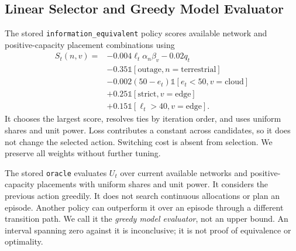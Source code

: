 \documentclass[letterpaper,journal]{IEEEtran}
\newcommand{\pol}[1]{\texttt{#1}}
\begin{document}
\subsection{Linear Selector and Greedy Model Evaluator}
The stored \pol{information\_equivalent} policy scores available network and positive-capacity placement combinations using
\begin{align}
S_t(n,v)={}&-0.004\ell_t\alpha_n\beta_v-0.02q_t\\
&-0.35\mathbb{1}[\text{outage},n=\text{terrestrial}]\nonumber\\
&-0.002(50-e_t)\mathbb{1}[e_t<50,v=\text{cloud}]\nonumber\\
&+0.25\mathbb{1}[\text{strict},v=\text{edge}]\nonumber\\
&+0.15\mathbb{1}[\ell_t>40,v=\text{edge}].\nonumber
\end{align}
It chooses the largest score, resolves ties by iteration order, and uses uniform shares and unit power. Loss contributes a constant across candidates, so it does not change the selected action. Switching cost is absent from selection. We preserve all weights without further tuning.

The stored \pol{oracle} evaluates $U_t$ over current available networks and positive-capacity placements with uniform shares and unit power. It considers the previous action greedily. It does not search continuous allocations or plan an episode. Another policy can outperform it over an episode through a different transition path. We call it the \emph{greedy model evaluator}, not an upper bound. An interval spanning zero against it is inconclusive; it is not proof of equivalence or optimality.
\end{document}
